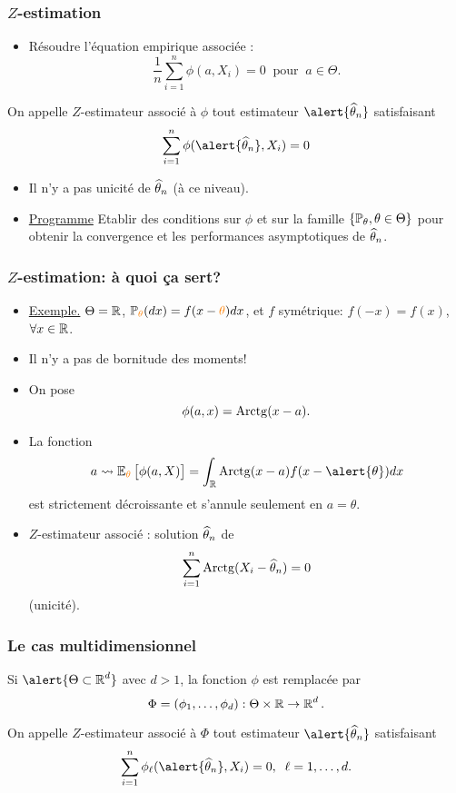 \begin{frame}
\frametitle{$Z$-estimation}
\begin{itemize}
\item Résoudre l'équation \alert{ empirique} associée :
$$\boxed{\frac{1}{n}\sum_{i = 1}^n \phi(a, X_i)=0\;\;\text{pour}\;\;a\in \Theta.}$$
\end{itemize}
\begin{df}
On appelle \alert{$Z$-estimateur} associé à $\phi$ tout estimateur $\alert{\est}$ satisfaisant
$$\sum_{i = 1}^n \phi(\alert{\est}, X_i)=0$$
\end{df}
\begin{itemize}
\item Il n'y a pas unicité de $\operatorname{\widehat \theta_{\mathnormal{n}}}$ (à ce niveau).
\item \underline{Programme} \alert{ Etablir des conditions}
sur $\phi$ et sur la famille $\{\operatorname{{\mathbb P}}_\theta, \theta \in
\Theta\}$ pour obtenir la convergence et les performances
asymptotiques de $\operatorname{\widehat \theta_{\mathnormal{n}}}$.
  \end{itemize}
\end{frame}

\begin{frame}
\frametitle{$Z$-estimation: \`a quoi \c{c}a sert?}
\begin{itemize}
\item \underline{Exemple.} $\Theta = \operatorname{{\mathbb R}}$,
$\PP_{\tco{\theta}}(dx) = f(x-\tco{\theta})dx$, et
$f$ sym\'etrique: $f(-x)=f(x)$, $\forall x\in \operatorname{{\mathbb R}}$.
\item \alert{ Il n'y a pas de bornitude des moments!}
\item On pose
$$\phi(a,x)={\rm Arctg}(x-a).$$
\item La fonction
$$a \leadsto \E_{\tco{\theta}}\big[\phi(a,X)\big] =
\int_{\R}{\rm Arctg}(x-a)f(x-\alert{\theta})dx$$ est
strictement d\'ecroissante et s'annule seulement en $a=\theta.$
\item \alert{$Z$-estimateur associé :} solution $\operatorname{\widehat \theta_{\mathnormal{n}}}$ de
$$\sum_{i = 1}^n{\rm Arctg}(X_i-\operatorname{\widehat \theta_{\mathnormal{n}}}) = 0$$
\alert{ (unicit\'e)}.
\end{itemize}
\end{frame}


\begin{frame}
\frametitle{Le cas multidimensionnel}
Si $\alert{ \Theta \subset \R^d}$ avec \alert{ $d  >1$}, la fonction $\phi$ est remplacée par
$$\Phi = (\phi_1,\ldots,\phi_d):\Theta \times \operatorname{{\mathbb R}} \rightarrow \operatorname{{\mathbb R}}^d.$$
\begin{definition}
On appelle $Z$-estimateur associé à $\Phi$ tout estimateur $\alert{\est}$ satisfaisant
$$\sum_{i = 1}^n \phi_\ell(\alert{\est}, X_i)=0,\;\;\ell = 1,\ldots, d.$$
\end{definition}
\end{frame}

